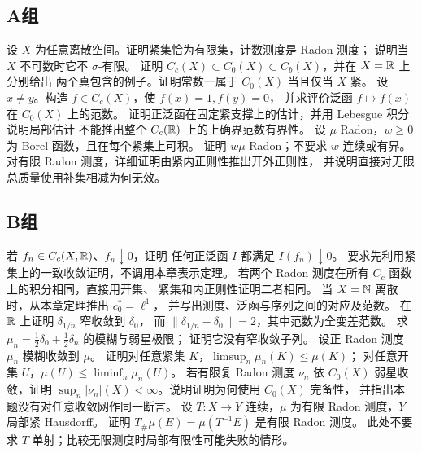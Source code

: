 \subsection*{A组}
\begin{enumerate}[label=\textbf{\thechapter.\arabic*.}]
设 \(X\) 为任意离散空间。证明紧集恰为有限集，计数测度是 Radon 测度；
说明当 \(X\) 不可数时它不 \(\sigma\)-有限。
证明 \(C_c(X)\subset C_0(X)\subset C_b(X)\)，并在 \(X=\mathbb{R}\) 上分别给出
两个真包含的例子。证明常数一属于 \(C_0(X)\) 当且仅当 \(X\) 紧。
设 \(x\ne y\)。构造 \(f\in C_c(X)\)，使 \(f(x)=1,f(y)=0\)，
并求评价泛函 \(f\mapsto f(x)\) 在 \(C_0(X)\) 上的范数。
证明正泛函在固定紧支撑上的估计，并用 Lebesgue 积分说明局部估计
不能推出整个 \(C_c(\mathbb{R})\) 上的上确界范数有界性。
设 \(\mu\) Radon，\(w\ge0\) 为 Borel 函数，且在每个紧集上可积。
证明 \(w\mu\) Radon；不要求 \(w\) 连续或有界。
对有限 Radon 测度，详细证明由紧内正则性推出开外正则性，
并说明直接对无限总质量使用补集相减为何无效。
\end{enumerate}
\subsection*{B组}
\begin{enumerate}[label=\textbf{\thechapter.\arabic*.},resume]
若 \(f_n\in C_c(X,\mathbb{R})\)、\(f_n\downarrow0\)，证明
任何正泛函 \(I\) 都满足 \(I(f_n)\downarrow0\)。
要求先利用紧集上的一致收敛证明，不调用本章表示定理。
若两个 Radon 测度在所有 \(C_c\) 函数上的积分相同，直接用开集、
紧集和内正则性证明二者相同。
当 \(X=\mathbb{N}\) 离散时，从本章定理推出 \(c_0^*=\ell^1\)，
并写出测度、泛函与序列之间的对应及范数。
在 \(\mathbb{R}\) 上证明 \(\delta_{1/n}\) 窄收敛到 \(\delta_0\)，
而 \(\|\delta_{1/n}-\delta_0\|=2\)，其中范数为全变差范数。
求 \(\mu_n=\tfrac12\delta_0+\tfrac12\delta_n\) 的模糊与弱星极限；
证明它没有窄收敛子列。
设正 Radon 测度 \(\mu_n\) 模糊收敛到 \(\mu\)。
证明对任意紧集 \(K\)，\(\limsup_n\mu_n(K)\le\mu(K)\)；
对任意开集 \(U\)，\(\mu(U)\le\liminf_n\mu_n(U)\)。
若有限复 Radon 测度 \(\nu_n\) 依 \(C_0(X)\) 弱星收敛，证明
\(\sup_n|\nu_n|(X)<\infty\)。说明证明为何使用 \(C_0(X)\) 完备性，
并指出本题没有对任意收敛网作同一断言。
设 \(T:X\to Y\) 连续，\(\mu\) 为有限 Radon 测度，\(Y\) 局部紧 Hausdorff。
证明 \(T_\#\mu(E)=\mu(T^{-1}E)\) 是有限 Radon 测度。
此处不要求 \(T\) 单射；比较无限测度时局部有限性可能失败的情形。
\end{enumerate}
